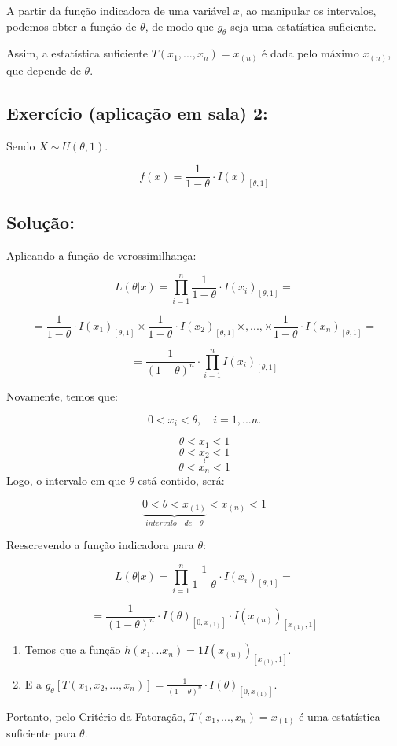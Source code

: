 \documentclass[
]{report}
\providecommand{\tightlist}{%
  \setlength{\itemsep}{0pt}\setlength{\parskip}{0pt}}\usepackage{longtable,booktabs,array}
\begin{document}
A partir da função indicadora de uma variável \(x\), ao manipular os
intervalos, podemos obter a função de \(\theta\), de modo que
\(g_{\theta}\) seja uma estatística suficiente.

Assim, a estatística suficiente \(T(x_{1},...,x_{n})= x_{(n)}\) é dada
pelo máximo \(x_{(n)}\), que depende de \(\theta\).

\subsection{Exercício (aplicação em sala)
2:}\label{exercuxedcio-aplicauxe7uxe3o-em-sala-2}

Sendo \(X ∼ U(\theta,1)\).

\[
f(x)=\frac{1}{1-\theta} \cdot I(x)_{[\theta,1]}
\]

\subsection{Solução:}\label{soluuxe7uxe3o-1}

Aplicando a função de verossimilhança:

\[
L(\theta|x) = \prod_{i=1}^{n} \frac{1}{1-\theta} \cdot I(x_i)_{[\theta,1]}= 
\]

\[
= \frac{1}{1-\theta} \cdot I(x_1)_{[\theta,1]} \times \frac{1}{1-\theta} \cdot I(x_2)_{[\theta,1]} \times,..., \times \frac{1}{1-\theta} \cdot I(x_n)_{[\theta,1]}=   
\]

\[
= \frac{1}{(1-\theta)^{n}} \cdot \prod_{i=1}^{n} I(x_i)_{[\theta,1]}
\]

Novamente, temos que:

\[
0 < x_i < \theta, \quad i=1,...n.
\]

\[
\theta < x_1 < 1
\] \[
\theta < x_2 < 1
\] \[
.
\] \[
.
\] \[
.
\] \[
\theta < x_n < 1
\] Logo, o intervalo em que \(\theta\) está contido, será:

\[
\underbrace{0< \theta < x_{(1)}}_{intervalo \quad de \quad \theta}< x_{(n)} < 1
\]

Reescrevendo a função indicadora para \(\theta\):

\[
L(\theta|x) = \prod_{i=1}^{n} \frac{1}{1-\theta} \cdot I(x_i)_{[\theta,1]}= 
\]

\[
= \frac{1}{(1-\theta)^{n}} \cdot I(\theta)_{[0,x_{(1)}]} \cdot I(x_{(n)})_{[x_{(1)}, 1]}
\]

\begin{enumerate}
\def\labelenumi{\arabic{enumi}.}
\tightlist
\item
  Temos que a função \(h(x_1,..x_n) = 1I(x_{(n)})_{[x_{(1)}, 1]}\).
\item
  E a
  \(g_\theta[T(x_1,x_2,...,x_n)] = \frac{1}{(1-\theta)^{n}} \cdot I(\theta)_{[0,x_{(1)}]}\).
\end{enumerate}

Portanto, pelo Critério da Fatoração, \(T(x_{1},...,x_{n})= x_{(1)}\) é
uma estatística suficiente para \(\theta\).
\end{document}
